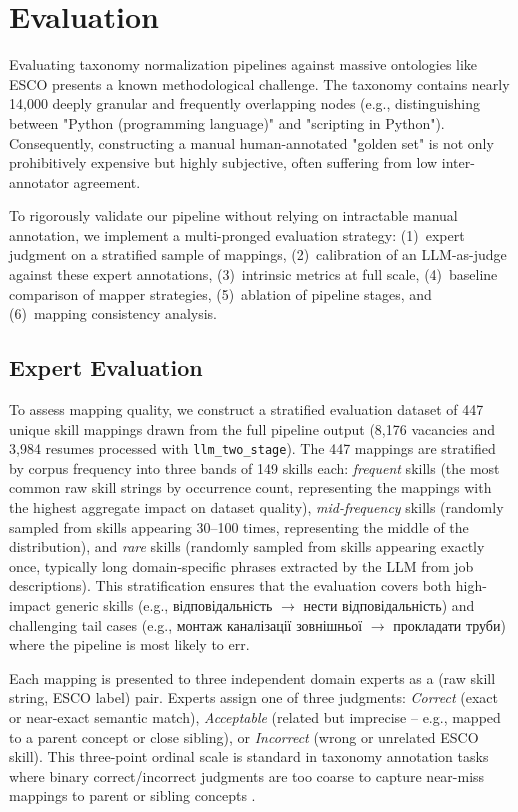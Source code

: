 \documentclass[11pt]{article}
\newcommand{\uk}[1]{{\fontencoding{T2A}\selectfont #1}}
\begin{document}
\section{Evaluation}
\label{sec:eval}
Evaluating taxonomy normalization pipelines against massive ontologies like ESCO presents a known methodological challenge. The taxonomy contains nearly 14,000 deeply granular and frequently overlapping nodes (e.g., distinguishing between "Python (programming language)" and "scripting in Python"). Consequently, constructing a manual human-annotated "golden set" is not only prohibitively expensive but highly subjective, often suffering from low inter-annotator agreement.

To rigorously validate our pipeline without relying on intractable manual annotation, we implement a multi-pronged evaluation strategy: (1)~expert judgment on a stratified sample of mappings, (2)~calibration of an LLM-as-judge against these expert annotations, (3)~intrinsic metrics at full scale, (4)~baseline comparison of mapper strategies, (5)~ablation of pipeline stages, and (6)~mapping consistency analysis.

\subsection{Expert Evaluation}
\label{sec:eval-expert}

To assess mapping quality, we construct a stratified evaluation dataset of 447 unique skill mappings drawn from the full pipeline output (8,176 vacancies and 3,984 resumes processed with \texttt{llm\_two\_stage}). The 447 mappings are stratified by corpus frequency into three bands of 149 skills each: \emph{frequent} skills (the most common raw skill strings by occurrence count, representing the mappings with the highest aggregate impact on dataset quality), \emph{mid-frequency} skills (randomly sampled from skills appearing 30--100 times, representing the middle of the distribution), and \emph{rare} skills (randomly sampled from skills appearing exactly once, typically long domain-specific phrases extracted by the LLM from job descriptions). This stratification ensures that the evaluation covers both high-impact generic skills (e.g., \uk{відповідальність} $\to$ \uk{нести відповідальність}) and challenging tail cases (e.g., \uk{монтаж каналізації зовнішньої} $\to$ \uk{прокладати труби}) where the pipeline is most likely to err.

Each mapping is presented to three independent domain experts as a (raw skill string, ESCO label) pair. Experts assign one of three judgments: \emph{Correct} (exact or near-exact semantic match), \emph{Acceptable} (related but imprecise -- e.g., mapped to a parent concept or close sibling), or \emph{Incorrect} (wrong or unrelated ESCO skill). This three-point ordinal scale is standard in taxonomy annotation tasks where binary correct/incorrect judgments are too coarse to capture near-miss mappings to parent or sibling concepts \citep{Malandri2025}.
\end{document}
